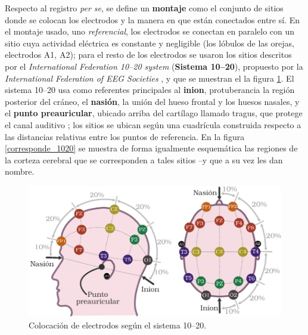 Respecto al registro \textit{per se}, se define un \textbf{montaje} como
el conjunto de sitios donde se colocan los electrodos y la manera en
que están conectados entre sí.
En el montaje usado, uno \textit{referencial}, los electrodos se conectan en paralelo con un 
sitio cuya actividad eléctrica es constante y negligible (los lóbulos de las orejas,
electrodos A1, A2); para el resto de los electrodos se usaron los sitios descritos por el
\textit{International Federation 10--20 system} (\textbf{Sistema 10--20}), propuesto por la 
\textit{International Federation of EEG Societies} \cite{Jasper58,AASM07},
y que se muestran el la figura \ref{img1020}.
El sistema 10--20 usa como referentes principales al \textbf{inion}, protuberancia la región posterior 
del cráneo, el \textbf{nasión}, la unión del hueso frontal y los huesos nasales, y el 
\textbf{punto preauricular}, ubicado arriba del cartílago llamado tragus, que protege el canal 
auditivo \cite{Butkov07}; los sitios se ubican según una cuadrícula construida respecto a las
distancias relativas entre los puntos de referencia.
En la figura \ref{corresponde_1020} se muestra de
forma igualmente esquemática las regiones de la corteza cerebral que se corresponden a tales 
sitios --y que a su vez les dan nombre.

\begin{figure}
\centering
\includegraphics[width=\linewidth]{./img_diagramas/cabeza_proporcionada_color.pdf} 
\caption{Colocación de electrodos según el sistema 10--20.
}
\label{img1020}
\end{figure}

